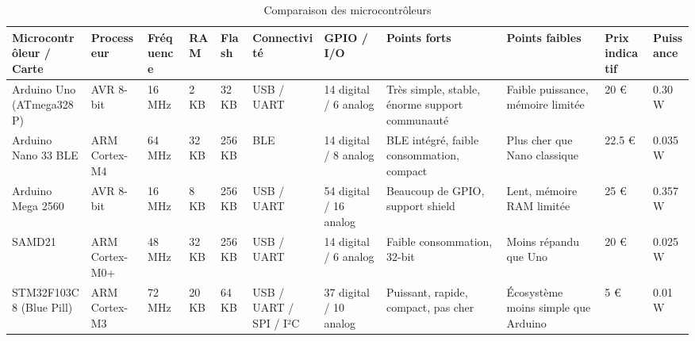\begin{landscape}
    \begin{table}[!ht]
        \centering
        \begin{tabularx}{\textwidth}{
            |p{3.5cm}|p{2.5cm}|p{2.2cm}|p{1.2cm}|p{1.4cm}|
            p{2.7cm}|p{2.5cm}|p{3cm}|p{3cm}|p{1.8cm}|p{2.2cm}|
            }
            \hline
            \textbf{Microcontrôleur / Carte} & \textbf{Processeur} & \textbf{Fréquence}    & \textbf{RAM}            & \textbf{Flash} &
            \textbf{Connectivité}            & \textbf{GPIO / I/O} & \textbf{Points forts} & \textbf{Points faibles} &
            \textbf{Prix indicatif}          & \textbf{Puissance}                                                                                                                                                                                                                                 \\
            \hline
            Arduino Uno (ATmega328P)         & AVR 8-bit           & 16 MHz                & 2 KB                    & 32 KB          & USB / UART             & 14 digital / 6 analog  & Très simple, stable, énorme support communauté & Faible puissance, mémoire limitée   & 20 €   & 0.30 W  \\
            \hline
            Arduino Nano 33 BLE              & ARM Cortex-M4       & 64 MHz                & 32 KB                   & 256 KB         & BLE                    & 14 digital / 8 analog  & BLE intégré, faible consommation, compact      & Plus cher que Nano classique        & 22.5 € & 0.035 W \\
            \hline
            Arduino Mega 2560                & AVR 8-bit           & 16 MHz                & 8 KB                    & 256 KB         & USB / UART             & 54 digital / 16 analog & Beaucoup de GPIO, support shield               & Lent, mémoire RAM limitée           & 25 €   & 0.357 W \\
            \hline
            SAMD21                           & ARM Cortex-M0+      & 48 MHz                & 32 KB                   & 256 KB         & USB / UART             & 14 digital / 6 analog  & Faible consommation, 32-bit                    & Moins répandu que Uno               & 20 €   & 0.025 W \\
            \hline
            STM32F103C8 (Blue Pill)          & ARM Cortex-M3       & 72 MHz                & 20 KB                   & 64 KB          & USB / UART / SPI / I²C & 37 digital / 10 analog & Puissant, rapide, compact, pas cher            & Écosystème moins simple que Arduino & 5 €    & 0.01 W  \\
            \hline
        \end{tabularx}
        \caption{Comparaison des microcontrôleurs}
    \end{table}


\end{landscape}

